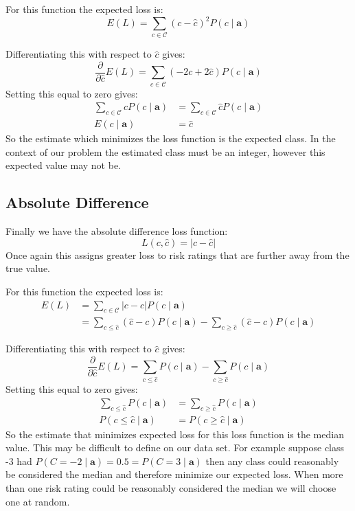 For this function the expected loss is:
\begin{equation}
	E(L) = \sum_{c \in \mathcal{C}} (c - \hat{c})^2P(c \mid \mathbf{a}) 
\end{equation}

Differentiating this with respect to $\hat{c}$ gives:
\begin{equation}
	\frac{\partial}{\partial \hat{c}} E(L) = \sum_{c \in \mathcal{C}} (-2c + 2\hat{c})P(c \mid \mathbf{a}) 
\end{equation}
Setting this equal to zero gives:
\begin{align}
	\sum_{c \in \mathcal{C}} cP(c \mid \mathbf{a}) & = \sum_{c \in \mathcal{C}} \hat{c}P(c \mid \mathbf{a}) \\
	E(c \mid \mathbf{a}) & = \hat{c}
\end{align}
So the estimate which minimizes the loss function is the expected class.
In the context of our problem the estimated class must be an integer, however this expected value may not be.

\subsection{Absolute Difference}
Finally we have the absolute difference loss function:
\begin{equation}
	L(c, \hat{c}) = | c - \hat{c} |
\end{equation}
Once again this assigns greater loss to risk ratings that are further away from the true value.

For this function the expected loss is:
\begin{align}
	E(L) & = \sum_{c \in \mathcal{C}} |c - \hat{c}|P(c \mid \mathbf{a}) \\
	     & = \sum_{c \leq \hat{c}} (\hat{c} - c)P(c \mid \mathbf{a}) - \sum_{c \geq \hat{c}} (\hat{c} - c)P(c \mid \mathbf{a})
\end{align}

Differentiating this with respect to $\hat{c}$ gives:
\begin{equation}
	\frac{\partial}{\partial \hat{c}} E(L) = \sum_{c \leq \hat{c}} P(c \mid \mathbf{a}) - \sum_{c \geq \hat{c}} P(c \mid \mathbf{a})
\end{equation}
Setting this equal to zero gives:
\begin{align}
	\sum_{c \leq \hat{c}} P(c \mid \mathbf{a}) & = \sum_{c \geq \hat{c}} P(c \mid \mathbf{a}) \\
	P(c \leq \hat{c} \mid \mathbf{a}) & = P(c \geq \hat{c} \mid \mathbf{a})
\end{align}
So the estimate that minimizes expected loss for this loss function is the median value.
This may be difficult to define on our data set.
For example suppose class -3 had $P(C = -2 \mid \mathbf{a}) = 0.5 = P(C=3 \mid \mathbf{a})$ then any class could reasonably be considered the median and therefore minimize our expected loss.
When more than one risk rating could be reasonably considered the median we will choose one at random.

